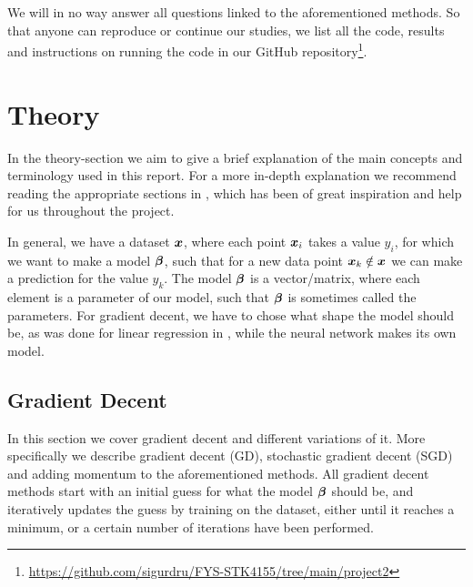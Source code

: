 \documentclass[12pt]{extarticle}
\begin{document}
We will in no way answer all questions linked to the aforementioned methods. So that anyone can reproduce or continue our studies, we list all the code, results and instructions on running the code in our GitHub repository\footnote{\href{https://github.com/sigurdru/FYS-STK4155/tree/main/project1}{https://github.com/sigurdru/FYS-STK4155/tree/main/project2}}.

\section{Theory}
In the theory-section we aim to give a brief explanation of the main concepts and terminology used in this report. For a more in-depth explanation we recommend reading the appropriate sections in \cite{2019}, which has been of great inspiration and help for us throughout the project.

In general, we have a dataset $\boldsymbol x$, where each point $\boldsymbol x_i$ takes a value $y_i$, for which we want to make a model $\boldsymbol{\beta}$, such that for a new data point $\boldsymbol x_k \notin \boldsymbol x$ we can make a prediction for the value $y_k$.  The model $\boldsymbol{\beta}$ is a vector/matrix, where each element is a parameter of our model, such that $\boldsymbol{\beta}$ is sometimes called the parameters. For gradient decent, we have to chose what shape the model should be, as was done for linear regression in \cite{project1}, while the neural network makes its own model.

\subsection{Gradient Decent}\label{sec:GD}
In this section we cover gradient decent and different variations of it. More specifically we describe gradient decent (GD), stochastic gradient decent (SGD) and adding momentum to the aforementioned methods. All gradient decent methods start with an initial guess for what the model $\boldsymbol{\beta}$ should be, and iteratively updates the guess by training on the dataset, either until it reaches a minimum, or a certain number of iterations have been performed.
\end{document}
